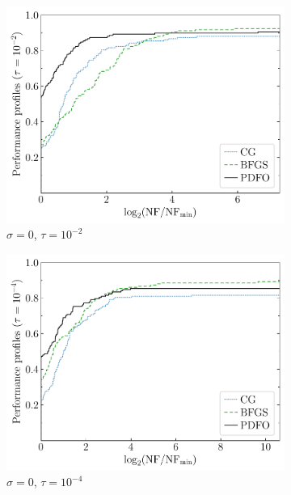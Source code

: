 \documentclass[
    smallextended,  %
    draft,          %
    final,          %
]{svjour3}
\begin{document}
\begin{figure}[htbp]
    \begin{subfigure}{.48\textwidth}
        \centering
        \includegraphics[width=\textwidth]{perf-plain-bfgs_cg_pdfo-50-2.pdf}
        \caption{$\sigma = 0$, $\tau = 10^{-2}$}
    \end{subfigure}
    \hfill
    \begin{subfigure}{.48\textwidth}
        \centering
        \includegraphics[width=\textwidth]{perf-plain-bfgs_cg_pdfo-50-4.pdf}
        \caption{$\sigma = 0$, $\tau = 10^{-4}$}
    \end{subfigure}
    \hfill
    \begin{subfigure}{.48\textwidth}

\end{subfigure}
\end{figure}
\end{document}
